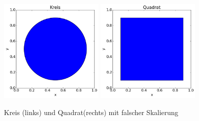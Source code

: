 \documentclass[12pt,a4paper]{scrartcl}
\begin{document}
%
\begin{figure}[ht]
  \centering
  \includegraphics[width=0.45\textwidth,height=0.2\textheight]{kreis}
  \includegraphics[width=0.45\textwidth,height=0.2\textheight]{quadrat}
  \caption{Kreis (links) und Quadrat(rechts) mit falscher Skalierung}
  \label{fig:kreis_quadrat_falsch}
\end{figure}
\end{document}
